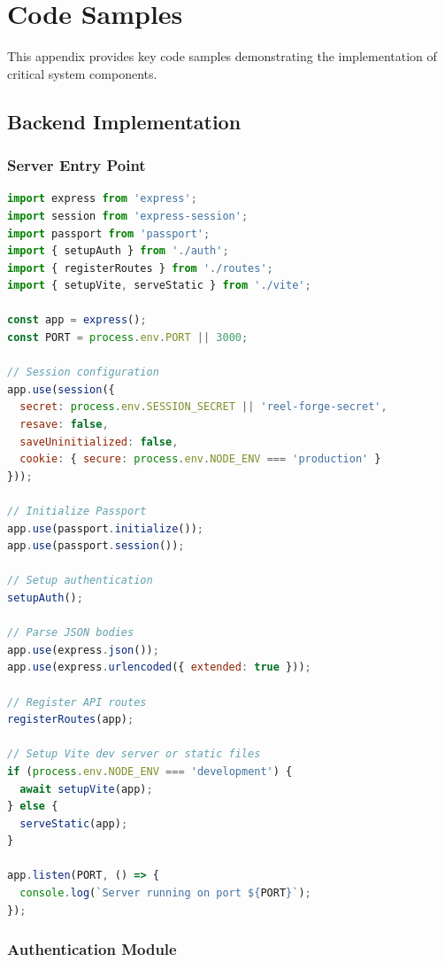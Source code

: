 \chapter{Code Samples}
\label{appendix:code}

This appendix provides key code samples demonstrating the implementation of critical system components.

\section{Backend Implementation}

\subsection{Server Entry Point}

\begin{lstlisting}[language=JavaScript, caption=server/index.ts - Main server configuration]
import express from 'express';
import session from 'express-session';
import passport from 'passport';
import { setupAuth } from './auth';
import { registerRoutes } from './routes';
import { setupVite, serveStatic } from './vite';

const app = express();
const PORT = process.env.PORT || 3000;

// Session configuration
app.use(session({
  secret: process.env.SESSION_SECRET || 'reel-forge-secret',
  resave: false,
  saveUninitialized: false,
  cookie: { secure: process.env.NODE_ENV === 'production' }
}));

// Initialize Passport
app.use(passport.initialize());
app.use(passport.session());

// Setup authentication
setupAuth();

// Parse JSON bodies
app.use(express.json());
app.use(express.urlencoded({ extended: true }));

// Register API routes
registerRoutes(app);

// Setup Vite dev server or static files
if (process.env.NODE_ENV === 'development') {
  await setupVite(app);
} else {
  serveStatic(app);
}

app.listen(PORT, () => {
  console.log(`Server running on port ${PORT}`);
});
\end{lstlisting}

\subsection{Authentication Module}

